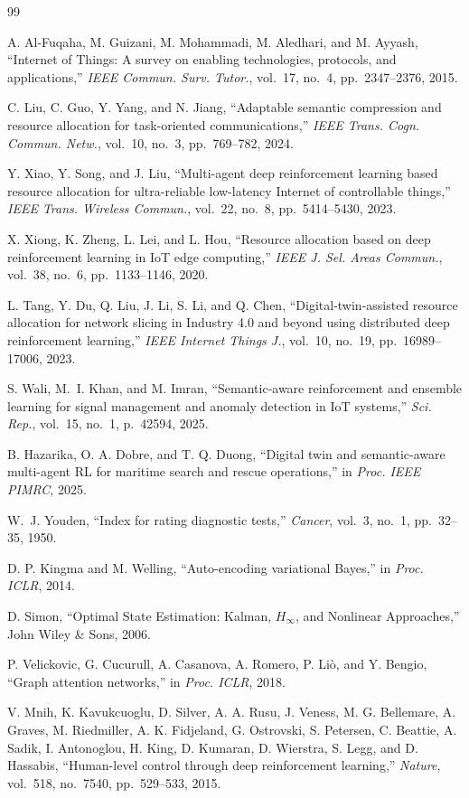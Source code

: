 \documentclass[conference]{IEEEtran}
\begin{document}
\balance
\begin{thebibliography}{99}

A. Al-Fuqaha, M. Guizani, M. Mohammadi, M. Aledhari, and M. Ayyash,
``Internet of Things: A survey on enabling technologies, protocols, and
applications,''
\textit{IEEE Commun. Surv. Tutor.}, vol.~17, no.~4, pp.~2347--2376, 2015.

C. Liu, C. Guo, Y. Yang, and N. Jiang,
``Adaptable semantic compression and resource allocation for
task-oriented communications,''
\textit{IEEE Trans. Cogn. Commun. Netw.}, vol.~10, no.~3,
pp.~769--782, 2024.

Y. Xiao, Y. Song, and J. Liu,
``Multi-agent deep reinforcement learning based resource allocation for ultra-reliable low-latency Internet of controllable things,''
\textit{IEEE Trans. Wireless Commun.}, vol.~22, no.~8, pp.~5414--5430, 2023.

X. Xiong, K. Zheng, L. Lei, and L. Hou,
``Resource allocation based on deep reinforcement learning in IoT edge
computing,''
\textit{IEEE J. Sel. Areas Commun.}, vol.~38, no.~6,
pp.~1133--1146, 2020.

L. Tang, Y. Du, Q. Liu, J. Li, S. Li, and Q. Chen,
``Digital-twin-assisted resource allocation for network slicing in
Industry 4.0 and beyond using distributed deep reinforcement learning,''
\textit{IEEE Internet Things J.}, vol.~10, no.~19,
pp.~16989--17006, 2023.

S. Wali, M.~I. Khan, and M. Imran,
``Semantic-aware reinforcement and ensemble learning for signal management
and anomaly detection in IoT systems,''
\textit{Sci. Rep.}, vol.~15, no.~1, p.~42594, 2025.

B. Hazarika, O. A. Dobre, and T. Q. Duong,
``Digital twin and semantic-aware multi-agent RL for maritime search
and rescue operations,''
in \textit{Proc. IEEE PIMRC}, 2025.

W.~J. Youden,
``Index for rating diagnostic tests,''
\textit{Cancer}, vol.~3, no.~1, pp.~32--35, 1950.

D. P. Kingma and M. Welling,
``Auto-encoding variational Bayes,''
in \textit{Proc. ICLR}, 2014.

D. Simon,
``Optimal State Estimation: Kalman, $H_\infty$, and Nonlinear Approaches,''
John Wiley \& Sons, 2006.

P. Velickovic, G. Cucurull, A. Casanova, A. Romero, P. Li\`{o},
and Y. Bengio,
``Graph attention networks,''
in \textit{Proc. ICLR}, 2018.

V. Mnih, K. Kavukcuoglu, D. Silver, A. A. Rusu, J. Veness, M. G. Bellemare,
A. Graves, M. Riedmiller, A. K. Fidjeland, G. Ostrovski, S. Petersen,
C. Beattie, A. Sadik, I. Antonoglou, H. King, D. Kumaran, D. Wierstra,
S. Legg, and D. Hassabis,
``Human-level control through deep reinforcement learning,''
\textit{Nature}, vol.~518, no.~7540, pp.~529--533, 2015.

\end{thebibliography}
\end{document}
